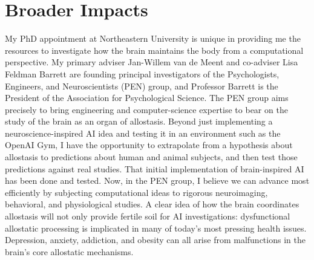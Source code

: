 \section*{Broader Impacts}
\begin{singlespace}
My PhD appointment at Northeastern University is unique in providing me the resources
to investigate how the brain maintains the body from a computational perspective. My
primary adviser Jan-Willem van de Meent and co-adviser Lisa Feldman Barrett are founding
principal investigators of the Psychologists, Engineers, and Neuroscientists (PEN) group, and
Professor Barrett is the President of the Association for Psychological Science.
The PEN group aims precisely to bring engineering and computer-science expertise to bear on
the study of the brain as an organ of
allostasis\cite{Kleckner2017}.
Beyond just implementing a neuroscience-inspired AI idea and testing it in an
environment such as the OpenAI Gym, I have the opportunity to extrapolate from a
hypothesis about allostasis to predictions about human and animal subjects, and then
test those predictions against real studies.  That initial implementation of brain-inspired
AI has been done and tested\cite{Cullen2018,Penny}.  Now, in the PEN group, I believe we
can advance most efficiently by subjecting computational ideas to rigorous neuroimaging,
behavioral, and physiological studies.  A clear idea of how the brain coordinates
allostasis will not only provide fertile soil for AI investigations: dysfunctional
allostatic processing is implicated in many of today's most pressing health issues.
Depression, anxiety, addiction, and obesity can all arise from malfunctions in
the brain's core allostatic mechanisms\cite{Rosen2004,Stephan2016}.
\end{singlespace}
